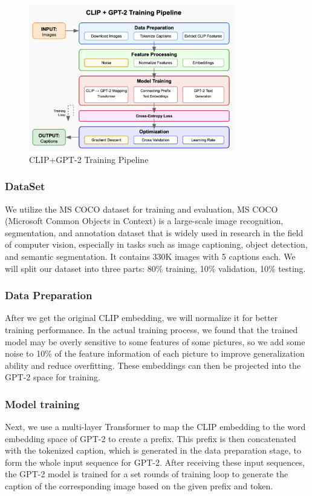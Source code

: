 \documentclass[11pt]{article}
\begin{document}
    \begin{figure}[h]
    \centering
    \includegraphics[width=0.8\textwidth]{figure1.png}
    \caption{CLIP+GPT-2 Training Pipeline}
    \label{fig:architecture}
    \end{figure}

    \subsubsection{DataSet}

    We utilize the MS COCO dataset \cite{COCO}for training and evaluation, 
    MS COCO (Microsoft Common Objects in Context) 
    is a large-scale image recognition, segmentation, 
    and annotation dataset that is widely used in research 
    in the field of computer vision, especially in tasks 
    such as image captioning, object detection, and semantic 
    segmentation. It contains 330K images with 5 captions each. 
    We will split our dataset into three parts: 80\% training, 10\% validation, 10\% testing.

    \subsubsection{Data Preparation}
    After we get the original CLIP embedding, we will normalize it for better training performance. In the actual training process, 
    we found that the trained model may be overly sensitive to some features of some pictures, 
    so we add some noise to 10\% of the feature information of each picture to improve generalization ability and reduce overfitting. 
    These embeddings can then be projected into the GPT-2 space for training.
\pagebreak
    \subsubsection{Model training}
    Next, we use a multi-layer Transformer to map the 
    CLIP embedding to the word embedding space of GPT-2 
    to create a prefix. This prefix is then concatenated 
    with the tokenized caption, which is generated in the data preparation stage,  
    to form the whole input sequence for GPT-2. After receiving these input sequences, 
    the GPT-2 model is trained for a set rounds of training loop to generate the caption of the corresponding image based on the given prefix and token.
\end{document}
